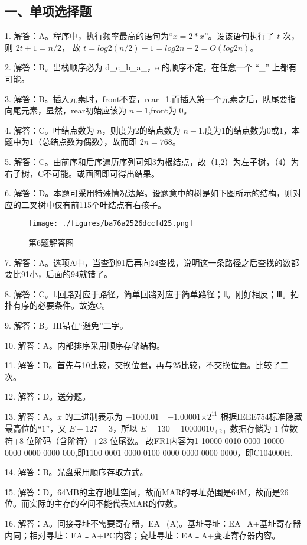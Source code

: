 \subsection{一、单项选择题}
1. 解答：A。程序中，执行频率最高的语句为“$x=2*x$”。设该语句执行了 $t$ 次，则 $2t+1=n/2$， 故 $t=log2(n/2)-1=log2n-2= O(log2n)$。

2. 解答：B。出栈顺序必为 d\_c\_b\_a\_，e 的顺序不定，在任意一个 “\_” 上都有可能。

3. 解答：B。插入元素时，front不变，rear+1.而插入第一个元素之后，队尾要指向尾元素，显然，rear初始应该为 $n-1$,front为 $0$。

4. 解答：C。叶结点数为 $n$，则度为2的结点数为 $n-1$,度为1的结点数为0或1，本题中为1（总结点数为偶数），故而即 $2n=768$。

5. 解答：C。由前序和后序遍历序列可知3为根结点，故（1,2）为左子树，（4）为右子树，C不可能。或画图即可得出结果。

6. 解答：D。本题可采用特殊情况法解。设题意中的树是如下图所示的结构，则对应的二叉树中仅有前115个叶结点有右孩子。\\
\begin{figure}[ht]
\centering
\texttt{[image: ./figures/ba76a2526dccfd25.png]}
\caption{第6题解答图} \label{fig_Na11_4}
\end{figure}

7. 解答：A。选项A中，当查到91后再向24查找，说明这一条路径之后查找的数都要比91小，后面的94就错了。

8. 解答：C。Ⅰ.回路对应于路径，简单回路对应于简单路径；Ⅱ。刚好相反；Ⅲ。拓扑有序的必要条件。故选C。

9. 解答：B。III错在“避免”二字。

10. 解答：A。内部排序采用顺序存储结构。

11. 解答：B。首先与10比较，交换位置，再与25比较，不交换位置。比较了二次。

12. 解答：D。送分题。

13. 解答：A。$x$ 的二进制表示为 $-1000.01$﹦$-1.000 01$×$2^{11}$ 根据IEEE754标准隐藏最高位的“$1$”，又 $E-127=3$，所以 $E=130=1000 0010_{(2)}$ 数据存储为 $1$ 位数符+$8$ 位阶码（含阶符）+$23$ 位尾数。
故FR1内容为1 10000 0010 0000 10000 0000 0000 0000 000,即1100 0001 0000 0100 0000 0000 0000 0000，即C104000H.

14. 解答：B。光盘采用顺序存取方式。

15. 解答：D。64MB的主存地址空间，故而MAR的寻址范围是64M，故而是26位。而实际的主存的空间不能代表MAR的位数。

16. 解答：A。间接寻址不需要寄存器，EA=(A)。基址寻址：EA=A+基址寄存器内同；相对寻址：EA﹦A+PC内容；变址寻址：EA﹦A+变址寄存器内容。

